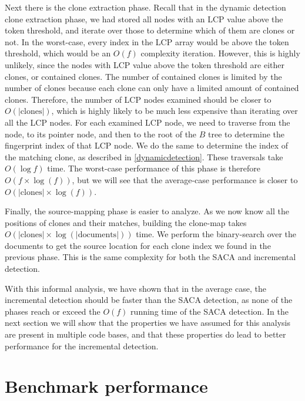 
Next there is the clone extraction phase. Recall that in the dynamic detection clone
extraction phase, we had stored all nodes with an LCP value above the token threshold, and
iterate over those to determine which of them are clones or not. In the worst-case, every
index in the LCP array would be above the token threshold, which would be an $O(f)$
complexity iteration. However, this is highly unlikely, since the nodes with LCP value
above the token threshold are either clones, or contained clones. The number of contained
clones is limited by the number of clones because each clone can only have a limited
amount of contained clones. Therefore, the number of LCP nodes examined should be closer
to $O(\vert\text{clones}\vert)$, which is highly likely to be much less expensive than
iterating over all the LCP nodes. For each examined LCP node, we need to traverse from the
node, to its pointer node, and then to the root of the $B$ tree to determine the
fingerprint index of that LCP node. We do the same to determine the index of the matching
clone, as described in \cref{dynamicdetection}. These traversals take $O(\log f)$ time.
The worst-case performance of this phase is therefore $O(f \times \log(f))$, but we will
see that the average-case performance is closer to $O(\vert\text{clones}\vert \times
\log(f))$.

Finally, the source-mapping phase is easier to analyze. As we now know all the positions
of clones and their matches, building the clone-map takes $O(\vert\text{clones}\vert
\times \log(\vert\text{documents}\vert))$ time. We perform the binary-search over the
documents to get the source location for each clone index we found in the previous phase.
This is the same complexity for both the SACA and incremental detection.

With this informal analysis, we have shown that in the average case, the incremental
detection should be faster than the SACA detection, as none of the phases reach or exceed
the $O(f)$ running time of the SACA detection. In the next section we will show that the
properties we have assumed for this analysis are present in multiple code bases, and that
these properties do lead to better performance for the incremental detection.


\section{Benchmark performance}

